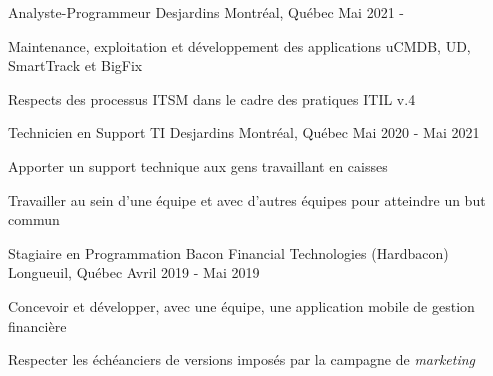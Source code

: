 

\begin{cventries}

  \cventry
    {Analyste-Programmeur} %
    {Desjardins} %
    {Montréal, Québec} %
    {Mai 2021 - } %
    {
      \begin{cvitems} %
        \item {Maintenance, exploitation et développement des applications uCMDB, UD, SmartTrack et BigFix}
        \item {Respects des processus ITSM dans le cadre des pratiques ITIL v.4}
      \end{cvitems}
    }

  \cventry
    {Technicien en Support TI} %
    {Desjardins} %
    {Montréal, Québec} %
    {Mai 2020 - Mai 2021} %
    {
      \begin{cvitems} %
        \item {Apporter un support technique aux gens travaillant en caisses}
        \item {Travailler au sein d'une équipe et avec d'autres équipes pour atteindre un but commun}
      \end{cvitems}
    }
    
  \cventry
    {Stagiaire en Programmation} %
    {Bacon Financial Technologies (Hardbacon)} %
    {Longueuil, Québec} %
    {Avril 2019 - Mai 2019} %
    {
      \begin{cvitems} %
        \item {Concevoir et développer, avec une équipe, une application mobile de gestion financière}
        \item {Respecter les échéanciers de versions imposés par la campagne de \textit{marketing}}
      \end{cvitems}
    }


\end{cventries}
